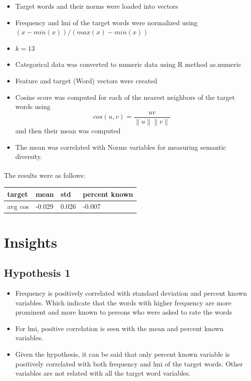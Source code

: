\documentclass[11pt,a4paper]{article}
\begin{document}
\begin{itemize}
	\item Target words and their norms were loaded into vectors
	\item Frequency and lmi of the target words were normalized using
		$(x -min(x))/(max(x)-min(x))$
		
	\item $k = 13$
	\item Categorical data was converted to numeric data using R method as.numeric
	\item Feature and target (Word) vectors were created
	\item Cosine score was computed for each of the nearest neighbors of the target words using
	\begin{equation*}
	cos(u,v) = \frac{uv}{\left \| u \right \| \left \| v \right \|}
	\end{equation*}
	and then their mean was computed
	
	\item The mean was correlated with Norms variables for measuring semantic diversity.
\end{itemize}

\paragraph{}
The results were as follows:
\begin{table}[H]
\centering
\begin{tabular}{@{}llll@{}}
\toprule
target  & mean   & std   & percent known \\ \midrule
avg cos & -0.029 & 0.026 & -0.007        \\ \bottomrule
\end{tabular}
\end{table}

\section{Insights}

\subsection{Hypothesis 1}
\begin{itemize}
	\item Frequency is positively correlated with standard deviation and percent known variables. Which indicate that 
	the words with higher frequency are more prominent and more known to persons who were asked to rate the words
	
	\item For lmi, positive correlation is seen with the mean and percent known variables.
	\item Given the hypothesis, it can be said that only percent known variable is positively correlated with both frequency and lmi of the target words. Other variables are not related with all the target word variables. 
\end{itemize}
\end{document}
